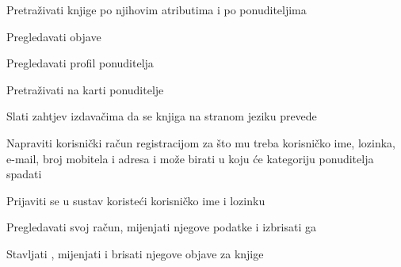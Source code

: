 			
			\begin{packed_enum}

				 \item {}
                
                    				\begin{packed_enum}
                        				\item Pretraživati knjige po njihovim atributima i po ponuditeljima
                        				\item Pregledavati objave
                        				\item Pregledavati profil ponuditelja
					      	\item Pretraživati na karti ponuditelje
                       				\item Slati zahtjev izdavačima da se knjiga na stranom jeziku prevede
                    				\end{packed_enum}
				\item  {}
				
				\begin{packed_enum}
					
					\item Napraviti korisnički račun registracijom za što mu treba korisničko ime, lozinka, e-mail, broj mobitela i adresa i može birati u koju će kategoriju ponuditelja spadati
						
				
		
				\end{packed_enum}
			
				\item  {}
				
				\begin{packed_enum}
					
					\item Prijaviti se u sustav koristeći korisničko ime i lozinku
                   				\item Pregledavati svoj račun, mijenjati njegove podatke i izbrisati ga
					\item Stavljati , mijenjati i brisati njegove objave za knjige
					

\end{packed_enum}
\end{packed_enum}
